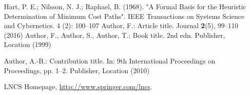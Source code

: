 \documentclass[runningheads]{llncs}
\begin{document}
%
%
%
%
%
%




%
\begin{thebibliography}{8}
Hart, P. E.; Nilsson, N. J.; Raphael, B. (1968). "A Formal Basis for the Heuristic Determination of Minimum Cost Paths". IEEE Transactions on Systems Science and Cybernetics. 4 (2): 100–107 
Author, F.: Article title. Journal \textbf{2}(5), 99--110 (2016)
Author, F., Author, S., Author, T.: Book title. 2nd edn. Publisher,
Location (1999)

Author, A.-B.: Contribution title. In: 9th International Proceedings
on Proceedings, pp. 1--2. Publisher, Location (2010)

LNCS Homepage, \url{http://www.springer.com/lncs}.
\end{thebibliography}
\end{document}
